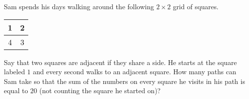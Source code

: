 Sam spends his days walking around the following $2\times 2$ grid of squares.
\begin{tabular}[t]{|c|c|}\hline
1&2\\ \hline
4&3 \\ \hline
\end{tabular}Say that two squares are adjacent if they share a side. He starts at the square labeled $1$ and every second walks to an adjacent square. How many paths can Sam take so that the sum of the numbers on every square he visits in his path is equal to $20$ (not counting the square he started on)?